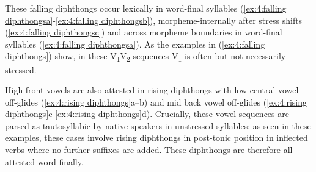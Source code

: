     \label{ex:4:falling diphthongsa}
        \label{ex:4:falling diphthongsb}
            \label{ex:4:falling diphthongsc}
                \label{ex:4:falling diphthongsd}
    \z
\z

These falling diphthongs occur lexically in word-final syllables (\ref{ex:4:falling diphthongsa}-\ref{ex:4:falling diphthongsb}), mor\-pheme-internally after stress shifts (\ref{ex:4:falling diphthongsc}) and across morpheme boundaries in word-final syllables (\ref{ex:4:falling diphthongsa}). As the examples in (\ref{ex:4:falling diphthongs}) show, in these V\textsubscript{1}V\textsubscript{2} sequences V\textsubscript{1} is often but not necessarily stressed.

High front vowels are also attested in rising diphthongs with low central vowel off-glides (\ref{ex:4:rising diphthongs}a--b) and mid back vowel off-glides (\ref{ex:4:rising diphthongs}c-\ref{ex:4:rising diphthongs}d). Crucially, these vowel sequences are parsed as tautosyllabic by native speakers in unstressed syllables: as seen in these examples, these cases involve rising diphthongs in post-tonic position in inflected verbs where no further suffixes are added. These diphthongs are therefore all attested word-finally.

